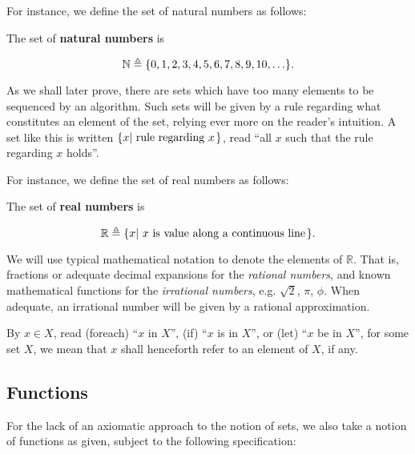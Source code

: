 For instance, we define the set of natural numbers as follows:

\begin{definition} The set of \textbf{natural numbers} is

$$\mathbb{N} \triangleq \mathopen{}\left\{{0,1,2,3,4,5,6,7,8,9,10,\ldots}\right\}\mathclose{}.$$

\end{definition}

As we shall later prove, there are sets which have too many elements to be
sequenced by an algorithm.  Such sets will be given by a rule regarding what
constitutes an element of the set, relying ever more on the reader's intuition.
A set like this is written $\mathopen{}\left\{{x\mathopen{}\left|\ {\text{rule regarding $x$}}\right.\mathclose{}}\right\}\mathclose{}$, read ``all
$x$ such that the rule regarding $x$ holds''.

For instance, we define the set of real numbers as follows:

\begin{definition} The set of \textbf{real numbers} is

$$\mathbb{R}\triangleq\mathopen{}\left\{{x\mathopen{}\left|\ {\text{$x$ is value along a continuous
line}}\right.\mathclose{}}\right\}\mathclose{}.$$

\end{definition}

We will use typical mathematical notation to denote the elements of
$\mathbb{R}$. That is, fractions or adequate decimal expansions for the
\emph{rational numbers}, and known mathematical functions for the
\emph{irrational numbers}, e.g. $\sqrt{2}$, $\pi$, $\phi$. When adequate,
an irrational number will be given by a rational approximation.

\begin{notation} By $x\in X$, read (foreach) ``$x$ in $X$'', (if) ``$x$ is in
$X$'', or (let) ``$x$ be in $X$'',  for some set $X$, we mean that $x$ shall
henceforth refer to an element of $X$, if any. \end{notation}


\subsection{Functions}

For the lack of an axiomatic approach to the notion of sets, we also take a
notion of functions as given, subject to the following specification:

